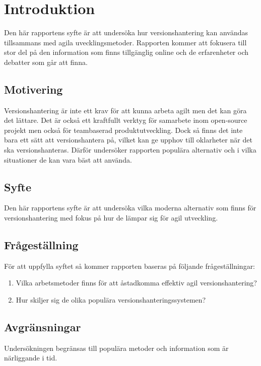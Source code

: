 \section{Introduktion}
\label{sec:bjorn-introduction}

Den här rapportens syfte är att undersöka hur versionshantering kan användas tillsammans med agila uvecklingsmetoder. Rapporten kommer att fokusera till stor del på den information som finns tillgänglig online och de erfarenheter och debatter som går att finna.

\subsection{Motivering}
\label{subsec:motivation}

Versionshantering är inte ett krav för att kunna arbeta agilt men det kan göra det lättare. Det är också ett kraftfullt verktyg för samarbete inom open-source projekt men också för teambaserad produktutveckling. Dock så finns det inte bara ett sätt att versionshantera på, vilket kan ge upphov till oklarheter när det ska versionshanteras. Därför undersöker rapporten populära alternativ och i vilka situationer de kan vara bäst att använda.

\subsection{Syfte}
\label{subsec:reason}
Den här rapportens syfte är att undersöka vilka moderna alternativ som finns för versionshantering med fokus på hur de lämpar sig för agil utveckling.

\subsection{Frågeställning}
\label{subsec:research-questions}

För att uppfylla syftet så kommer rapporten baseras på följande frågeställningar:

\begin{enumerate}
\item Vilka arbetsmetoder finns för att åstadkomma effektiv agil versionshantering?

\item Hur skiljer sig de olika populära versionshanteringssystemen?
\end{enumerate}




\subsection{Avgränsningar}
\label{subsec:delimitations}

Undersökningen begränsas till populära metoder och information som är närliggande i tid.